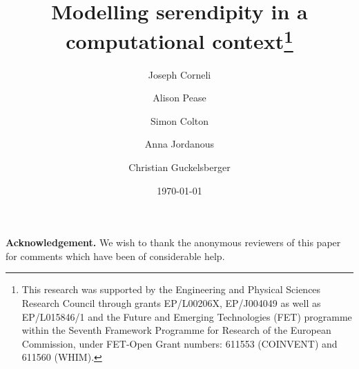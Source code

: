 \documentclass[smallextended,natbib]{svjour3} %
\theoremstyle{named}
\begin{document}
\title{Modelling serendipity in a computational context\thanks{This research was supported by the Engineering and Physical Sciences Research Council through grants EP/L00206X, EP/J004049 as well as EP/L015846/1 and the Future and Emerging Technologies (FET) programme within the Seventh Framework Programme for Research of the European Commission, under FET-Open Grant numbers: 611553 (COINVENT) and 611560 (WHIM).}}
\author{Joseph Corneli \and Alison Pease \and Simon Colton \and Anna Jordanous \and  Christian Guckelsberger}
\date{\today}

\maketitle



\bigskip

\maketitle


\setcounter{footnote}{0}








\bigskip

\noindent \textbf{Acknowledgement.}
We wish to thank the anonymous reviewers of this paper for comments
which have been of considerable help.





% 
\end{document}
